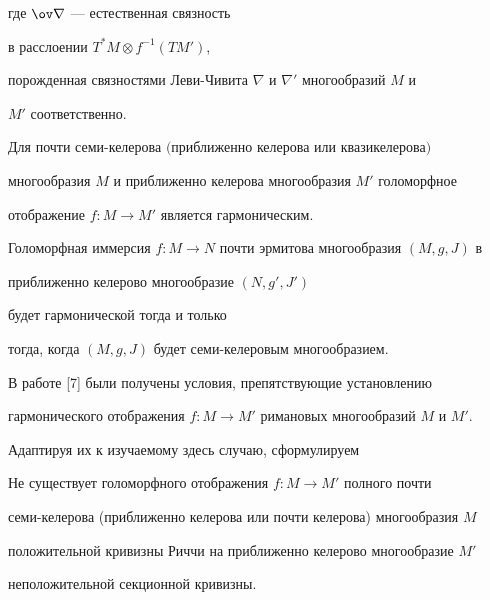где $\ov \nabla$ --- естественная связность 


в расслоении $T^*M\otimes f^{-1}(TM')$,


порожденная связностями Леви-Чивита $\nabla$ и $\nabla'$ многообразий  $M$ и


$M'$ соответственно.








\begin{thmnonum}


Для почти семи-келерова $($приближенно келерова или квазикелерова$)$


многообразия $M$ и приближенно келерова многообразия $M'$ голоморфное


отображение $f:M \to M'$ является гармоническим.


\end{thmnonum}








\begin{cor}


Голоморфная иммерсия $f:M \to N$ почти эрмитова многообразия $(M,g,J)$ в


приближенно келерово многообразие $(N,g',J')$ 


будет гармонической тогда и только


тогда, когда $(M,g,J)$ будет семи-келеровым многообразием.


\end{cor}





В работе [7] были получены условия, препятствующие установлению


гармонического отображения $f:M \to M'$ римановых многообразий $M$ и $M'$.


Адаптируя их к изучаемому здесь случаю, сформулируем





\begin{cor}


Не существует голоморфного отображения $f:M \to M'$ полного почти


семи-келерова (приближенно келерова или почти келерова) многообразия $M$


положительной кривизны Риччи на приближенно келерово многообразие $M'$


неположительной секционной кривизны.


\end{cor}





